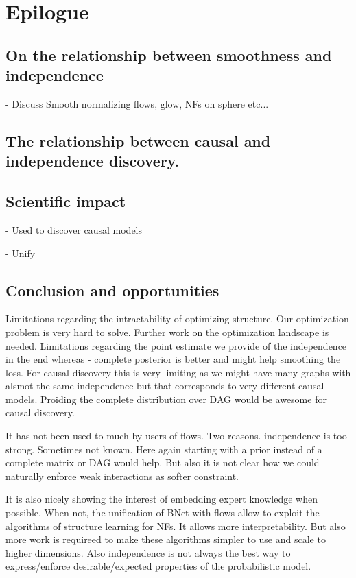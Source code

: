 

\section{Epilogue}

\subsection{On the relationship between smoothness and independence}
- Discuss Smooth normalizing flows, glow, NFs on sphere etc...

\subsection{The relationship between causal and independence discovery.}

\subsection{Scientific impact}

- Used to discover causal models

- Unify

\subsection{Conclusion and opportunities}

Limitations regarding the intractability of optimizing structure. Our optimization problem is very hard to solve. Further work on the optimization landscape is needed. Limitations regarding the point estimate we provide of the independence in the end whereas - complete posterior is better and might help smoothing the loss. For causal discovery this is very limiting as we might have many graphs with alsmot the same independence but that corresponds to very different causal models. Proiding the complete distribution over DAG would be awesome for causal discovery.

It has not been used to much by users of flows. Two reasons. independence is too strong. Sometimes not known. Here again starting with a prior instead of a complete matrix or DAG would help. But also it is not clear how we could naturally enforce weak interactions as softer constraint.

It is also nicely showing the interest of embedding expert knowledge when possible. When not, the unification of BNet with flows allow to exploit the algorithms of structure learning for NFs. It allows more interpretability.
But also more work is requireed to make these algorithms simpler to use and scale to higher dimensions. Also independence is not always the best way to express/enforce desirable/expected properties of the probabilistic model.
